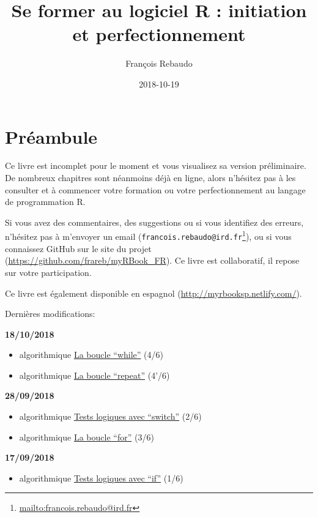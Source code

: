 \documentclass[]{book}
\title{Se former au logiciel R : initiation et perfectionnement}
\author{François Rebaudo}
\date{2018-10-19}
\providecommand{\tightlist}{%
  \setlength{\itemsep}{0pt}\setlength{\parskip}{0pt}}
\let\rmarkdownfootnote\footnote%
\def\footnote{\protect\rmarkdownfootnote}
\renewcommand{\href}[2]{#2\footnote{\url{#1}}}
\theoremstyle{definition}
\theoremstyle{definition}
\theoremstyle{definition}
\theoremstyle{remark}
\begin{document}
\maketitle

{
\setcounter{tocdepth}{1}
\tableofcontents
}
\chapter{Préambule}\label{preambule}

Ce livre est incomplet pour le moment et vous visualisez sa version
préliminaire. De nombreux chapitres sont néanmoins déjà en ligne, alors
n'hésitez pas à les consulter et à commencer votre formation ou votre
perfectionnement au langage de programmation R.

Si vous avez des commentaires, des suggestions ou si vous identifiez des
erreurs, n'hésitez pas à m'envoyer un email
(\href{mailto:francois.rebaudo@ird.fr}{\nolinkurl{francois.rebaudo@ird.fr}}),
ou si vous connaissez GitHub sur le site du projet
(\url{https://github.com/frareb/myRBook_FR}). Ce livre est collaboratif,
il repose sur votre participation.

Ce livre est également disponible en espagnol
(\url{http://myrbooksp.netlify.com/}).

Dernières modifications:

\textbf{18/10/2018}

\begin{itemize}
\tightlist
\item
  algorithmique \protect\hyperlink{l17while}{La boucle ``while''} (4/6)
\item
  algorithmique \protect\hyperlink{l17repeat}{La boucle ``repeat''}
  (4'/6)
\end{itemize}

\textbf{28/09/2018}

\begin{itemize}
\tightlist
\item
  algorithmique \protect\hyperlink{l17switch}{Tests logiques avec
  ``switch''} (2/6)
\item
  algorithmique \protect\hyperlink{l17for}{La boucle ``for''} (3/6)
\end{itemize}

\textbf{17/09/2018}

\begin{itemize}
\tightlist
\item
  algorithmique \protect\hyperlink{l17if}{Tests logiques avec ``if''}
  (1/6)
\end{itemize}
\end{document}
